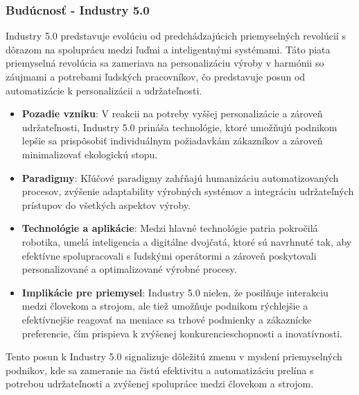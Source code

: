 \subsubsection{Budúcnosť - Industry 5.0}

Industry 5.0 predstavuje evolúciu od predchádzajúcich priemyselných revolúcií s dôrazom na spoluprácu medzi ľuďmi a inteligentnými systémami. Táto piata priemyselná revolúcia sa zameriava na personalizáciu výroby v harmónii so záujmami a potrebami ľudských pracovníkov, čo predstavuje posun od automatizácie k personalizácii a udržateľnosti.

\begin{itemize}
\item \textbf{Pozadie vzniku}: V reakcii na potreby vyššej personalizácie a zároveň udržateľnosti, Industry 5.0 prináša technológie, ktoré umožňujú podnikom lepšie sa prispôsobiť individuálnym požiadavkám zákazníkov a zároveň minimalizovať ekologickú stopu.

\item \textbf{Paradigmy}: Kľúčové paradigmy zahŕňajú humanizáciu automatizovaných procesov, zvýšenie adaptability výrobných systémov a integráciu udržateľných prístupov do všetkých aspektov výroby.

\item \textbf{Technológie a aplikácie}: Medzi hlavné technológie patria pokročilá robotika, umelá inteligencia a digitálne dvojčatá, ktoré sú navrhnuté tak, aby efektívne spolupracovali s ľudskými operátormi a zároveň poskytovali personalizované a optimalizované výrobné procesy.

\item \textbf{Implikácie pre priemysel}: Industry 5.0 nielen, že posilňuje interakciu medzi človekom a strojom, ale tiež umožňuje podnikom rýchlejšie a efektívnejšie reagovať na meniace sa trhové podmienky a zákaznícke preferencie, čím prispieva k zvýšenej konkurencieschopnosti a inovatívnosti.

\end{itemize}

Tento posun k Industry 5.0 signalizuje dôležitú zmenu v myslení priemyselných podnikov, kde sa zameranie na čistú efektivitu a automatizáciu prelína s potrebou udržateľnosti a zvýšenej spolupráce medzi človekom a strojom.

